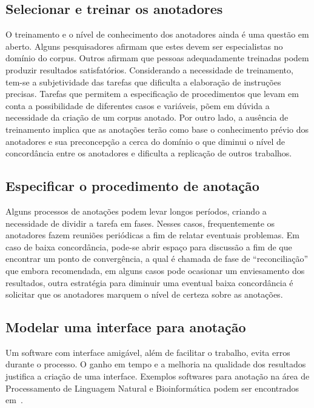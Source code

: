 

\subsection{Selecionar e treinar os anotadores}

O treinamento e o nível de conhecimento dos anotadores ainda é uma questão em aberto. Alguns pesquisadores afirmam que estes devem ser especialistas no domínio do corpus. Outros afirmam que pessoas adequadamente treinadas podem produzir resultados satisfatórios. 
Considerando a necessidade de treinamento, tem-se a subjetividade das tarefas que dificulta a elaboração de instruções precisas. Tarefas que permitem a especificação de procedimentos que levam em conta a possibilidade de diferentes casos e variáveis, põem em dúvida a necessidade da criação de um corpus anotado.
Por outro lado, a ausência de treinamento implica que as anotações terão como base o conhecimento prévio dos anotadores e sua preconcepção a cerca do domínio o que diminui o nível de concordância entre os anotadores e dificulta a replicação de outros trabalhos.


\subsection{Especificar o procedimento de anotação}
Alguns processos de anotações podem levar longos períodos, criando a necessidade de dividir a tarefa em fases. Nesses casos, frequentemente os anotadores fazem reuniões periódicas a fim de relatar eventuais problemas.  
Em caso de baixa concordância, pode-se abrir espaço para discussão a fim de que encontrar um ponto de convergência, a qual é chamada de fase de ``reconciliação'' que embora recomendada, em alguns casos pode ocasionar um enviesamento dos resultados, outra estratégia para diminuir uma eventual baixa concordância é solicitar que os anotadores marquem o nível de certeza sobre as anotações.

\subsection{Modelar uma interface para anotação}
Um software com interface amigável, além de facilitar o trabalho, evita erros durante o processo. 
O ganho em tempo e a melhoria na qualidade dos resultados justifica a criação de uma interface. 
Exemplos softwares para anotação na área de Processamento de Linguagem Natural e Bioinformática podem ser encontrados em~\cite{Gruenstein2007}.



